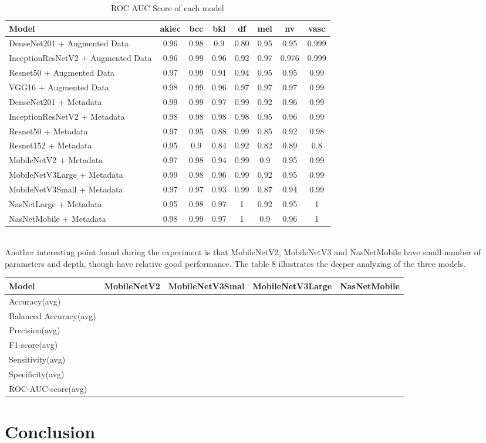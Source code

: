 \begin{table}[h]
	\centering
	\begin{tabular}{|l | c | c | c | c | c | c | c|} 
		\hline
		Model & akiec & bcc & bkl & df & mel & nv & vasc \\
		\hline
		DenseNet201 + Augmented Data & 0.96 & 0.98 & 0.9 & 0.80 & 0.95 & 0.95 & 0.999\\ 
		\hline
		InceptionResNetV2 + Augmented Data & 0.96 & 0.99 & 0.96 & 0.92 & 0.97 & 0.976 & 0.999\\
		\hline
		Resnet50 + Augmented Data & 0.97 & 0.99 & 0.91 & 0.94 & 0.95 & 0.95 & 0.99\\
		\hline 	
		VGG16 + Augmented Data & 0.98 & 0.99 & 0.96 & 0.97 & 0.97 & 0.97 & 0.99\\ 
		\hline		
		DenseNet201 + Metadata & 0.99 & 0.99 & 0.97 & 0.99 & 0.92 & 0.96 & 0.99\\
		\hline
		InceptionResNetV2 + Metadata & 0.98 & 0.98 & 0.98 & 0.98 & 0.95 & 0.96 & 0.99\\
		\hline
		Resnet50 + Metadata & 0.97 & 0.95 & 0.88 & 0.99 & 0.85 & 0.92 & 0.98\\
		\hline
		Resnet152 + Metadata & 0.95 & 0.9 & 0.84 & 0.92 & 0.82 & 0.89 & 0.8\\
		\hline
		MobileNetV2 + Metadata & 0.97 & 0.98 & 0.94 & 0.99 & 0.9 & 0.95 & 0.99\\
		\hline
		MobileNetV3Large + Metadata & 0.99 & 0.98 & 0.96 & 0.99 & 0.92 & 0.95 & 0.99\\
		\hline
		MobileNetV3Small + Metadata & 0.97 & 0.97 & 0.93 & 0.99 & 0.87 & 0.94 & 0.99\\
		\hline
		NasNetLarge + Metadata & 0.95 & 0.98 & 0.97 & 1 & 0.92 & 0.95 & 1\\
		\hline
		NasNetMobile + Metadata & 0.98 & 0.99 & 0.97 & 1 & 0.9 & 0.96 & 1\\
		\hline
	\end{tabular}
	\caption{ROC AUC Score of each model}
	\label{table:7}
\end{table}\\
Another interesting point found during the experiment is that MobileNetV2, MobileNetV3 and NasNetMobile have small number of parameters and depth, though have relative good performance. The table 8 illustrates the deeper analyzing of the three models.\\
\begin{table}
	\centering	
	\begin{tabular}{l | c | c | c | c|}
		\hline
		Model & MobileNetV2 & MobileNetV3Smal & MobileNetV3Large & NasNetMobile\\
		\hline
		Accuracy(avg)\\
		\hline
		Balanced Accuracy(avg)\\ 
		\hline
		Precision(avg)\\
		\hline
		F1-score(avg)\\
		\hline
		Sensitivity(avg)\\ 
		\hline
		Specificity(avg)\\
		\hline
		ROC-AUC-score(avg)\\
		\hline
	\end{tabular}
\end{table}
\section{Conclusion}

\clearpage
\pagebreak

